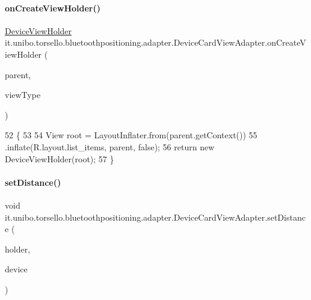 \paragraph{\texorpdfstring{on\+Create\+View\+Holder()}{onCreateViewHolder()}}
{\footnotesize\ttfamily \hyperlink{classit_1_1unibo_1_1torsello_1_1bluetoothpositioning_1_1adapter_1_1DeviceCardViewAdapter_1_1DeviceViewHolder}{Device\+View\+Holder} it.\+unibo.\+torsello.\+bluetoothpositioning.\+adapter.\+Device\+Card\+View\+Adapter.\+on\+Create\+View\+Holder (\begin{DoxyParamCaption}\item[{View\+Group}]{parent,  }\item[{int}]{view\+Type }\end{DoxyParamCaption})}


\begin{DoxyCode}
52                                                                                \{
53 
54         View root = LayoutInflater.from(parent.getContext())
55                 .inflate(R.layout.list\_items, parent, \textcolor{keyword}{false});
56         \textcolor{keywordflow}{return} \textcolor{keyword}{new} DeviceViewHolder(root);
57     \}
\end{DoxyCode}
\hypertarget{classit_1_1unibo_1_1torsello_1_1bluetoothpositioning_1_1adapter_1_1DeviceCardViewAdapter_a8d5baa2d386a92ba4fb20b71e6e517f9_a8d5baa2d386a92ba4fb20b71e6e517f9}{}\label{classit_1_1unibo_1_1torsello_1_1bluetoothpositioning_1_1adapter_1_1DeviceCardViewAdapter_a8d5baa2d386a92ba4fb20b71e6e517f9_a8d5baa2d386a92ba4fb20b71e6e517f9} 
\paragraph{\texorpdfstring{set\+Distance()}{setDistance()}}
{\footnotesize\ttfamily void it.\+unibo.\+torsello.\+bluetoothpositioning.\+adapter.\+Device\+Card\+View\+Adapter.\+set\+Distance (\begin{DoxyParamCaption}\item[{\hyperlink{classit_1_1unibo_1_1torsello_1_1bluetoothpositioning_1_1adapter_1_1DeviceCardViewAdapter_1_1DeviceViewHolder}{Device\+View\+Holder}}]{holder,  }\item[{\hyperlink{classit_1_1unibo_1_1torsello_1_1bluetoothpositioning_1_1model_1_1Device}{Device}}]{device }\end{DoxyParamCaption})\hspace{0.3cm}{\ttfamily [private]}}


